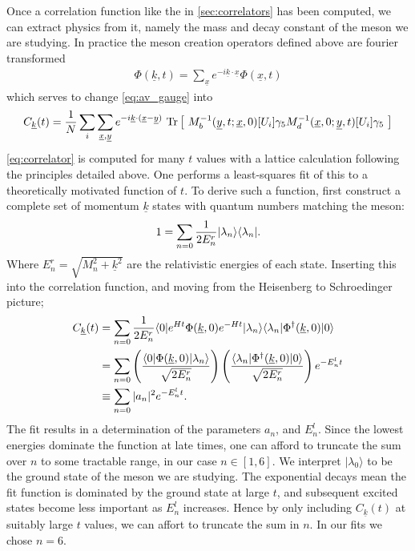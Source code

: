 Once a correlation function like the in \ref{sec:correlators} has been computed, we can extract physics from it, namely the mass and decay constant of the meson we are studying. In practice the meson creation operators defined above are fourier transformed
\begin{align}
	\Phi(\underline{k},t) = \sum_{\underline{x}} e^{-i\underline{k}\cdot\underline{x}} \Phi(\underline{x},t)
\end{align}
which serves to change \eqref{eq:av_gauge} into 
\begin{align}
	C_{\underline{k}}(t) = {1\over N} \sum_i \sum_{\underline{x},\underline{y}} e^{-i\underline{k}\cdot(\underline{x}-\underline{y})} \text{ Tr}\left[\text{ } M^{-1}_b(\underline{y},t;\underline{x},0)[U_i] \gamma_5 M^{-1}_d(\underline{x},0;\underline{y},t)[U_i] \gamma_5 \text{ }\right]
	\label{eq:correlator}
\end{align}
\eqref{eq:correlator} is computed for many $t$ values with a lattice calculation following the principles detailed above. One performs a least-squares fit of 
this to a theoretically motivated function of $t$. To derive such a function,
first construct a complete set of momentum $\underline{k}$ states with quantum numbers matching the meson:
\begin{align}
 1 = \sum_{n=0} {1\over 2E^r_n} | \lambda_n \rangle \langle \lambda_n |.
\end{align}
Where $E^r_n = \sqrt{ M_n^2 + \underline{k}^2}$ are the relativistic energies of each state. Inserting this into the correlation function, and moving from the Heisenberg to Schroedinger picture;
\begin{align}
	C_{\underline{k}}(t) &= \sum_{n=0} {1\over 2E^r_n} \langle 0 | e^{Ht} \Phi(\underline{k},0) e^{-Ht} | \lambda_n \rangle \langle \lambda_n | \Phi^{\dagger}(\underline{k},0) | 0 \rangle
	\nonumber
	\\ &= \sum_{n=0}  \left( {\langle 0 | \Phi(\underline{k},0) | \lambda_n \rangle \over \sqrt{2E^r_n}} \right) \left( {\langle \lambda_n | \Phi^{\dagger}(\underline{k},0) | 0 \rangle \over \sqrt{2E^r_n} } \right) e^{-E^l_n t}
	\nonumber
	\\ & \equiv \sum_{n=0} |a_n|^2 e^{-E^l_n t}.
	\label{eq:multiexponential}
\end{align}
The fit results in a determination of the parameters $a_n$, and $E^l_n$. Since the lowest energies dominate the function at late times, one can afford to truncate the sum over $n$ to some tractable range, in our case $n\in[1,6]$. We interpret $|\lambda_0\rangle$ to be the ground state of the meson we are studying. The exponential decays mean the fit function is dominated by the ground state at large $t$, and subsequent excited states become less important as $E^l_n$ increases. Hence by only including $C_{\underline{k}}(t)$ at suitably large $t$ values, we can affort to truncate the sum in $n$. In our fits we chose $n=6$.
